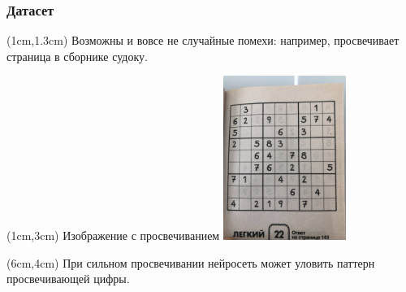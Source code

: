 \documentclass{beamer}
\begin{document}
\begin{frame}
\frametitle{Датасет}

\begin{textblock*}{10cm}(1cm,1.3cm)
Возможны и вовсе не случайные помехи: например, просвечивает страница в сборнике судоку.
\end{textblock*}

\begin{textblock*}{4cm}(1cm,3cm)
\tiny Изображение с просвечиванием
\includegraphics[width=4cm]{sudoku_8_through}
\end{textblock*}

\begin{textblock*}{5cm}(6cm,4cm)
\small При сильном просвечивании нейросеть может уловить паттерн просвечивающей цифры.
\end{textblock*}

\end{frame}
\end{document}
